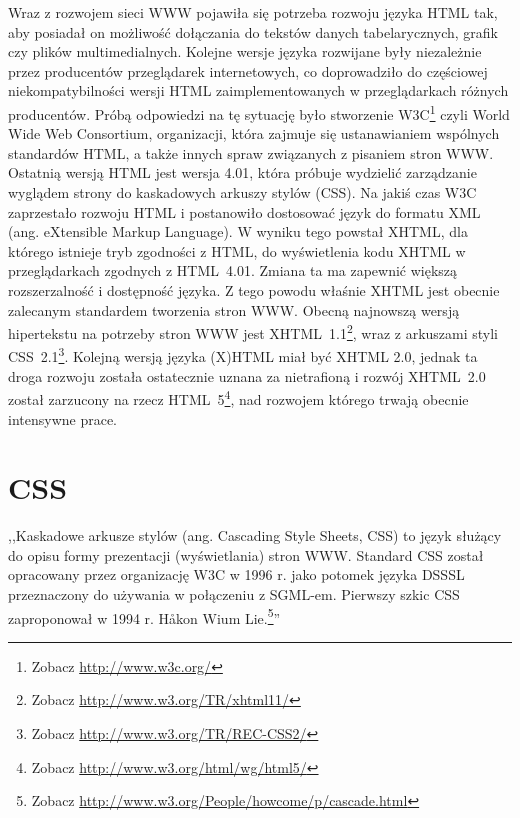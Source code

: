 \documentclass[a4paper,12pt,oneside]{report}
\begin{document}
Wraz z rozwojem sieci WWW pojawiła się potrzeba rozwoju języka HTML tak, aby posiadał on możliwość dołączania do tekstów danych tabelarycznych, grafik czy plików multimedialnych. Kolejne wersje języka rozwijane były niezależnie przez producentów przeglądarek internetowych, co doprowadziło do częściowej  niekompatybilności wersji HTML zaimplementowanych w przeglądarkach różnych producentów. Próbą odpowiedzi na tę sytuację było stworzenie W3C\footnote{Zobacz \url{http://www.w3c.org/}} czyli World Wide Web Consortium, organizacji, która zajmuje się ustanawianiem wspólnych standardów HTML, a także innych spraw związanych z pisaniem stron WWW. Ostatnią wersją HTML jest wersja 4.01, która próbuje wydzielić zarządzanie wyglądem strony do kaskadowych arkuszy stylów (CSS). Na jakiś czas W3C zaprzestało rozwoju HTML i postanowiło dostosować język do formatu XML (ang. eXtensible Markup Language). W wyniku tego powstał XHTML, dla którego istnieje tryb zgodności z HTML, do wyświetlenia kodu XHTML w przeglądarkach zgodnych z HTML~4.01. Zmiana ta ma zapewnić większą rozszerzalność i dostępność języka. Z tego powodu właśnie XHTML jest obecnie zalecanym standardem tworzenia stron WWW. Obecną najnowszą wersją hipertekstu na potrzeby stron WWW jest XHTML~1.1\footnote{Zobacz \url{http://www.w3.org/TR/xhtml11/}}, wraz z arkuszami styli CSS~2.1\footnote{Zobacz \url{http://www.w3.org/TR/REC-CSS2/}}. Kolejną wersją języka (X)HTML miał być XHTML 2.0, jednak ta droga rozwoju została ostatecznie uznana za nietrafioną i rozwój XHTML~2.0 został zarzucony na rzecz HTML~5\footnote{Zobacz \url{http://www.w3.org/html/wg/html5/}}, nad rozwojem którego trwają obecnie intensywne prace.

\section{CSS}
\label{sec:css}
,,Kaskadowe arkusze stylów (ang. Cascading Style Sheets, CSS) to język służący do opisu formy prezentacji (wyświetlania) stron WWW. Standard CSS został opracowany przez organizację W3C w 1996 r. jako potomek języka DSSSL przeznaczony do używania w połączeniu z SGML-em. Pierwszy szkic CSS zaproponował w 1994 r. Håkon Wium Lie.\footnote{Zobacz \url{http://www.w3.org/People/howcome/p/cascade.html}}''
\end{document}
